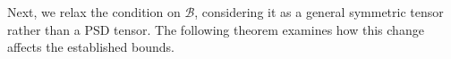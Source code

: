\documentclass[oupthm]{CUP-JNL-BCM}%
\theoremstyle{oupplain}
\newtheorem{theorem}{Theorem}[section]
\theoremstyle{oupdefinition}
\theoremstyle{oupremark}
\theoremstyle{oupproof}
\numberwithin{equation}{section}
\begin{document}
\noindent Next, we relax the condition on 
$\mathcal{B}$, considering it as a general symmetric tensor rather than a PSD tensor. The following theorem examines how this change affects the established bounds.











\end{document}
